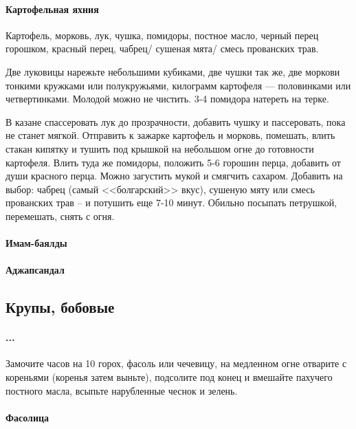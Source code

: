 \documentclass[11pt,a5paper]{article}
\begin{document}
\paragraph{Картофельная яхния} %

Картофель, морковь, лук, чушка, помидоры, постное масло, черный перец горошком, красный перец, чабрец/ сушеная мята/ смесь прованских трав.

Две луковицы нарежьте небольшими кубиками, две чушки так же, две моркови тонкими кружками или полукружьями, килограмм картофеля --- половинками или четвертинками. Молодой можно не чистить. 3-4 помидора натереть на терке.

В казане спассеровать лук до прозрачности, добавить чушку и пассеровать, пока не станет мягкой. Отправить к зажарке картофель и морковь, помешать, влить стакан кипятку и тушить под крышкой на небольшом огне до готовности картофеля. Влить туда же помидоры, положить 5-6 горошин перца, добавить от души красного перца. Можно загустить мукой и смягчить сахаром. Добавить на выбор: чабрец (самый <<болгарский>> вкус), сушеную мяту или смесь прованских трав -- и потушить еще 7-10 минут. Обильно посыпать петрушкой, перемешать, снять с огня.

\paragraph{Имам-баялды}

\paragraph{Аджапсандал}

\subsection{Крупы, бобовые}

\paragraph{...}

Замочите часов на 10 горох, фасоль или чечевицу, на медленном огне отварите с кореньями (коренья затем выньте), подсолите под конец и вмешайте пахучего постного масла, всыпьте нарубленные чеснок и зелень.


\paragraph{Фасолица}
\end{document}
